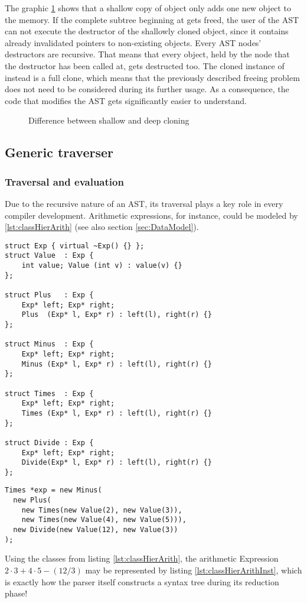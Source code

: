 The graphic \ref{fig:cloneIllustration} shows that a shallow copy of
object  only
adds one new object to the memory. If the complete subtree beginning
at  gets freed, the user of the AST can not execute the
destructor of the shallowly cloned object, since it contains already
invalidated pointers to non-existing objects.
Every AST nodes' destructors are recursive. That means
that every object, held by the node that the destructor has been called at,
gets destructed too. The cloned instance of
 instead is a full clone, which means that the
previously described freeing problem does not need to be considered
during its further usage. As a consequence, the code that modifies the
AST gets significantly easier to understand.

\begin{figure}[tb]
    \centering
    \caption{Difference between shallow and deep cloning}
    
    \label{fig:cloneIllustration}
\end{figure}

\subsection{Generic traverser}
\subsubsection{Traversal and evaluation}
Due to the recursive nature of an AST, its traversal plays a key role
in every compiler development. Arithmetic
expressions, for instance, could be modeled by
\ref{lst:classHierArith} (see also section \ref{sec:DataModel}).
%
\begin{lstlisting}[style=c++,caption={class hierarchy for integer
      arithmetic expression},label={lst:classHierArith}]
struct Exp { virtual ~Exp() {} };
struct Value  : Exp {
    int value; Value (int v) : value(v) {}
};

struct Plus   : Exp {
    Exp* left; Exp* right;
    Plus  (Exp* l, Exp* r) : left(l), right(r) {}
};

struct Minus  : Exp {
    Exp* left; Exp* right;
    Minus (Exp* l, Exp* r) : left(l), right(r) {}
};

struct Times  : Exp {
    Exp* left; Exp* right;
    Times (Exp* l, Exp* r) : left(l), right(r) {}
};

struct Divide : Exp {
    Exp* left; Exp* right;
    Divide(Exp* l, Exp* r) : left(l), right(r) {}
};
\end{lstlisting}
%
\begin{lstlisting}[style=c++,caption={Instance of a syntax
      tree},label={lst:classHierArithInst}]
Times *exp = new Minus(
  new Plus(
    new Times(new Value(2), new Value(3)),
    new Times(new Value(4), new Value(5))),
  new Divide(new Value(12), new Value(3))
);
\end{lstlisting}
%
Using the classes from listing \ref{lst:classHierArith}, the
arithmetic Expression \(2 \cdot 3 + 4 \cdot 5 - (12 / 3)\) may be
represented by listing \ref{lst:classHierArithInst}, which is exactly
how the parser itself constructs a syntax tree during its reduction
phase!

